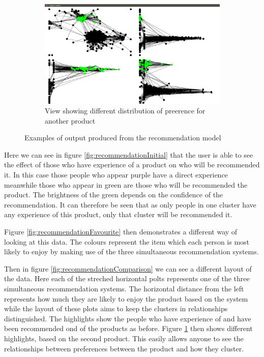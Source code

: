 \documentclass[12pt,a4paper]{article}
\begin{document}
\begin{figure}[htb]
\begin{subfigure}[c]{0.4\linewidth}
	\end{subfigure}
\quad
	\begin{subfigure}[c]{0.4\linewidth}
	\caption{View showing different distribution of preerence for another product}
	\label{fig:recommendationDifferent}
	\includegraphics[scale=0.1]{Recommendation4.png}
	\end{subfigure}
\caption{Examples of output produced from the recommendation model}
\label{fig:recommendation}
\end{figure}

Here we can see in figure \ref{fig:recommendationInitial} that the user is able to see the effect of those who have experience of a product on who will be recommended it. In this case those people who appear purple have a direct experience meanwhile those who appear in green are those who will be recommended the product. The brightness of the green depends on the confidence of the recommendation. It can therefore be seen that as only people in one cluster have any experience of this product, only that cluster will be recommended it.

Figure \ref{fig:recommendationFavourite} then demonstrates a different way of looking at this data. The colours represent the item which each person is most likely to enjoy by making use of the three simultaneous recommendation systems.

Then in figure \ref{fig:recommendationComparison} we can see a different layout of the data. Here each of the streched horizontal polts represents one of the three simultaneous recommendation systems. The horizontal distance from the left represents how much they are likely to enjoy the product based on the system while the layout of these plots aims to keep the clusters in relationships distinguished. The highlights show the people who have experience of and have been recommended ond of the products as before. Figure \ref{fig:recommendationDifferent} then shows different highlights, based on the second product. This easily allows anyone to see the relationships between preferences between the product and how they cluster.
\end{document}
